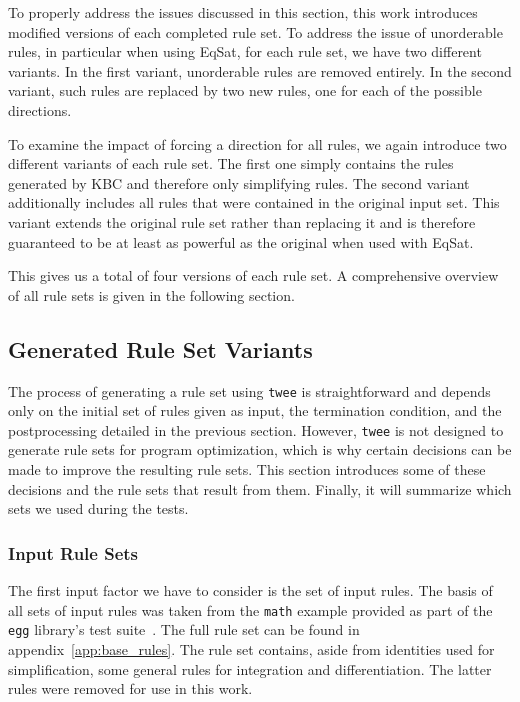 To properly address the issues discussed in this section, this work introduces modified versions of each completed rule set. To address the issue of unorderable rules, in particular when using EqSat, for each rule set, we have two different variants. In the first variant, unorderable rules are removed entirely. In the second variant, such rules are replaced by two new rules, one for each of the possible directions.

To examine the impact of forcing a direction for all rules, we again introduce two different variants of each rule set. The first one simply contains the rules generated by KBC and therefore only simplifying rules. The second variant additionally includes all rules that were contained in the original input set. This variant extends the original rule set rather than replacing it and is therefore guaranteed to be at least as powerful as the original when used with EqSat. 

This gives us a total of four versions of each rule set. A comprehensive overview of all rule sets is given in the following section.

\subsection{Generated Rule Set Variants}
\label{sec:rulegen-ruletypes}
The process of generating a rule set using \texttt{twee} is straightforward and depends only on the initial set of rules given as input, the termination condition, and the postprocessing detailed in the previous section. However, \texttt{twee} is not designed to generate rule sets for program optimization, which is why certain decisions can be made to improve the resulting rule sets. This section introduces some of these decisions and the rule sets that result from them. Finally, it will summarize which sets we used during the tests.

\subsubsection{Input Rule Sets}
\label{sec:input_rule_sets}
The first input factor we have to consider is the set of input rules. The basis of all sets of input rules was taken from the \texttt{math} example provided as part of the \texttt{egg} library's test suite~\citep{egg_math_rules}. The full rule set can be found in appendix~\ref{app:base_rules}. The rule set contains, aside from identities used for simplification, some general rules for integration and differentiation. The latter rules were removed for use in this work.

